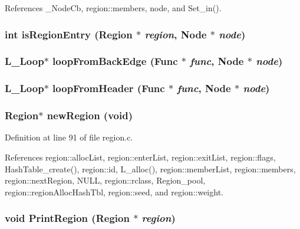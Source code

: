 References \_\-Node\-Cb, region::members, node, and Set\_\-in().
\subsubsection{\setlength{\rightskip}{0pt plus 5cm}int is\-Region\-Entry (\bf{Region} $\ast$ {\em region}, \bf{Node} $\ast$ {\em node})}\label{region_8h_4dd2cc570af1487b91f3a2505d8fd7e9}


\subsubsection{\setlength{\rightskip}{0pt plus 5cm}L\_\-Loop$\ast$ loop\-From\-Back\-Edge (\bf{Func} $\ast$ {\em func}, \bf{Node} $\ast$ {\em node})}\label{region_8h_5527b87770f7cfd2c8dad0e6886605e7}


\subsubsection{\setlength{\rightskip}{0pt plus 5cm}L\_\-Loop$\ast$ loop\-From\-Header (\bf{Func} $\ast$ {\em func}, \bf{Node} $\ast$ {\em node})}\label{region_8h_856f4cd09e08c23eed82f0cee01609ef}


\subsubsection{\setlength{\rightskip}{0pt plus 5cm}\bf{Region}$\ast$ new\-Region (void)}\label{region_8h_01dacc4f40c21699910354b785fb3d09}




Definition at line 91 of file region.c.

References region::alloc\-List, region::enter\-List, region::exit\-List, region::flags, Hash\-Table\_\-create(), region::id, L\_\-alloc(), region::member\-List, region::members, region::next\-Region, NULL, region::rclass, Region\_\-pool, region::region\-Alloc\-Hash\-Tbl, region::seed, and region::weight.
\subsubsection{\setlength{\rightskip}{0pt plus 5cm}void Print\-Region (\bf{Region} $\ast$ {\em region})}\label{region_8h_f459ecb682b11ba79d995ba1303e30ee}


